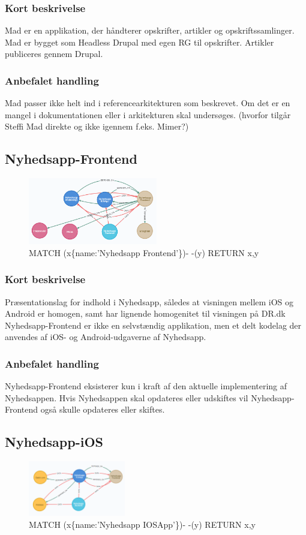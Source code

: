 \documentclass{article}
\begin{document}
\subsubsection{Kort beskrivelse}
Mad er en applikation, der håndterer opskrifter, artikler og opskriftssamlinger. Mad er bygget som Headless Drupal med egen RG til opskrifter. Artikler publiceres gennem Drupal. 
\subsubsection{Anbefalet handling}
Mad passer ikke helt ind i referencearkitekturen som beskrevet. Om det er en mangel i dokumentationen eller i arkitekturen skal undersøges. (hvorfor tilgår Steffi Mad direkte og ikke igennem f.eks. Mimer?)


\subsection{Nyhedsapp-Frontend}
\begin{figure}[h]
\includegraphics[width=160pt]{Nyhedsapp-Frontend.PNG}
\caption{MATCH (x\{name:'Nyhedsapp Frontend'\})- -(y) RETURN x,y}
\end{figure}
\subsubsection{Kort beskrivelse}
Præsentationslag for indhold i Nyhedsapp, således at visningen mellem iOS og Android er homogen, samt har lignende homogenitet til visningen på DR.dk
Nyhedsapp-Frontend er ikke en selvstændig applikation, men et delt kodelag der anvendes af iOS- og Android-udgaverne af Nyhedsapp. 
\subsubsection{Anbefalet handling}
Nyhedsapp-Frontend eksisterer kun i kraft af den aktuelle implementering af Nyhedsappen. Hvis Nyhedsappen skal opdateres eller udskiftes vil Nyhedsapp-Frontend også skulle opdateres eller skiftes.


\subsection{Nyhedsapp-iOS}
\begin{figure}[h]
\includegraphics[width=120pt]{Nyhedsapp-IOS.PNG}
\caption{MATCH (x\{name:'Nyhedsapp IOSApp'\})- -(y) RETURN x,y}
\end{figure}
\end{document}
